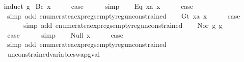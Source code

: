 \begin{isabellebody}
%
\isadelimproof
%
\endisadelimproof
%
\isatagproof
{}\isamarkupfalse%
{\isacharparenleft}induct\ g{\isacharparenright}\isanewline
{}\isamarkupfalse%
\ {\isacharparenleft}Bc\ x{\isacharparenright}\isanewline
\ \ \isamarkupfalse%
\ \isamarkupfalse%
\ {\isacharquery}case\isanewline
\ \ \ \ \isamarkupfalse%
\ simp\isanewline
{}\isamarkupfalse%
\isanewline
\ \ \isamarkupfalse%
\ {\isacharparenleft}Eq\ x{}a\ x{}{\isacharparenright}\isanewline
\ \ \isamarkupfalse%
\ \isamarkupfalse%
\ {\isacharquery}case\isanewline
\ \ \ \ \isamarkupfalse%
\ {\isacharparenleft}simp\ add{\isacharcolon}\ enumerate{\isacharunderscore}aexp{\isacharunderscore}regs{\isacharunderscore}empty{\isacharunderscore}reg{\isacharunderscore}unconstrained{\isacharparenright}\isanewline
{}\isamarkupfalse%
\isanewline
\ \ \isamarkupfalse%
\ {\isacharparenleft}Gt\ x{}a\ x{}{\isacharparenright}\isanewline
\ \ \isamarkupfalse%
\ \isamarkupfalse%
\ {\isacharquery}case\isanewline
\ \ \ \ \isamarkupfalse%
\ {\isacharparenleft}simp\ add{\isacharcolon}\ enumerate{\isacharunderscore}aexp{\isacharunderscore}regs{\isacharunderscore}empty{\isacharunderscore}reg{\isacharunderscore}unconstrained{\isacharparenright}\isanewline
{}\isamarkupfalse%
\isanewline
\ \ \isamarkupfalse%
\ {\isacharparenleft}Nor\ g{}\ g{}{\isacharparenright}\isanewline
\ \ \isamarkupfalse%
\ \isamarkupfalse%
\ {\isacharquery}case\isanewline
\ \ \ \ \isamarkupfalse%
\ simp\isanewline
{}\isamarkupfalse%
\isanewline
\ \ \isamarkupfalse%
\ {\isacharparenleft}Null\ x{\isacharparenright}\isanewline
\ \ \isamarkupfalse%
\ \isamarkupfalse%
\ {\isacharquery}case\isanewline
\ \ \ \ \isamarkupfalse%
\ {\isacharparenleft}simp\ add{\isacharcolon}\ enumerate{\isacharunderscore}aexp{\isacharunderscore}regs{\isacharunderscore}empty{\isacharunderscore}reg{\isacharunderscore}unconstrained{\isacharparenright}\isanewline
{}\isamarkupfalse%
%
\endisatagproof
{\isafoldproof}%
%
\isadelimproof
\isanewline
%
\endisadelimproof
\isanewline
{}\isamarkupfalse%
\ unconstrained{\isacharunderscore}variable{\isacharunderscore}swap{\isacharunderscore}gval{\isacharcolon}\isanewline

\end{isabellebody}
